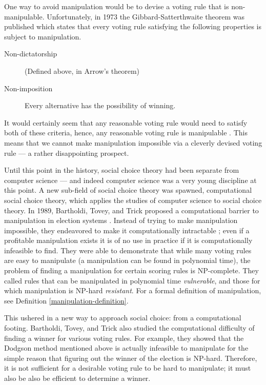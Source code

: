 	One way to avoid manipulation would be to devise a voting rule that is non-manipulable. Unfortunately, in 1973 the Gibbard-Satterthwaite theorem was published which states that every voting rule satisfying the following properties is subject to manipulation.
	\begin{description}
		\item[Non-dictatorship] (Defined above, in Arrow's theorem)
		\item[Non-imposition] Every alternative has the possibility of winning.
	\end{description}
	It would certainly seem that any reasonable voting rule would need to satisfy both of these criteria, hence, any reasonable voting rule is manipulable \cite{gibbard1973manipulation, satterthwaite1975strategy, duggan2000strategic}. This means that we cannot make manipulation impossible via a cleverly devised voting rule --- a rather disappointing prospect.


	Until this point in the history, social choice theory had been separate from computer science --- and indeed computer science was a very young discipline at this point. A new sub-field of social choice theory was spawned, computational social choice theory, which applies the studies of computer science to social choice theory. In 1989, Bartholdi, Tovey, and Trick proposed a computational barrier to manipulation in election systems \cite{bartholdi1989computational}. Instead of trying to make manipulation impossible, they endeavored to make it computationally intractable \cite{chevaleyre2007short}; even if a profitable manipulation exists it is of no use in practice if it is computationally infeasible to find. They were able to demonstrate that while many voting rules are easy to manipulate (a manipulation can be found in polynomial time), the problem of finding a manipulation for certain scoring rules is NP-complete. They called rules that can be manipulated in polynomial time \emph{vulnerable}, and those for which manipulation is NP-hard \emph{resistant}. For a formal definition of manipulation, see Definition \ref{manipulation-definition}.

	This ushered in a new way to approach social choice: from a computational footing. Bartholdi, Tovey, and Trick also studied the computational difficulty of finding a winner for various voting rules. For example, they showed that the Dodgson method mentioned above \cite{dodgson1876method} is actually infeasible to manipulate for the simple reason that figuring out the winner of the election is NP-hard. Therefore, it is not sufficient for a desirable voting rule to be hard to manipulate; it must also be also be efficient to determine a winner.

